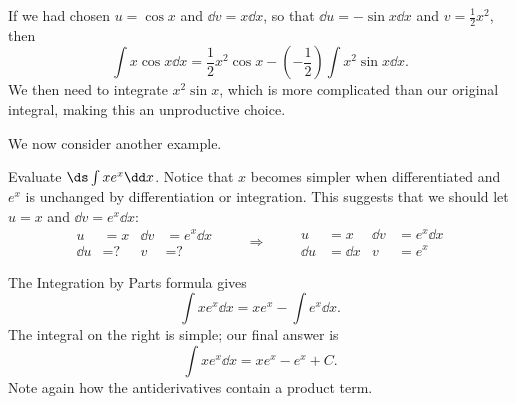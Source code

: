 If we had chosen $u=\cos x$ and $\dd v=x\dd x$, so that $\dd u=-\sin x\dd x$ and $v=\frac12x^2$, then
\[\int x\cos x\dd x=\frac12x^2\cos x-\left(-\frac12\right)\int x^2\sin x\dd x.\]
We then need to integrate $x^2\sin x$, which is more complicated than our original integral, making this an unproductive choice.



We now consider another example.

\begin{example}\label{ex_ibp2}%
Evaluate $\ds\int x e^x\dd x$.
\solution
Notice that $x$ becomes simpler when differentiated and $e^x$ is unchanged by differentiation or integration. This suggests that we should let $u=x$ and $\dd v=e^x\dd x$:
\[
\begin{aligned}
u&= x & \dd v&=e^x\dd x\\
\dd u&= \text{?} & v&=\text{?}
\end{aligned}
\qquad\Rightarrow\qquad
\begin{aligned}
u&= x & \dd v&=e^x\dd x\\
\dd u&= \dd x & v&=e^x
\end{aligned}
\]

The Integration by Parts formula gives
\[\int x e^x\dd x = xe^x - \int e^x\dd x.\]
The integral on the right is simple; our final answer is
\[\int xe^x\dd x = xe^x - e^x + C.\]
Note again how the antiderivatives contain a product term.
\end{example}

